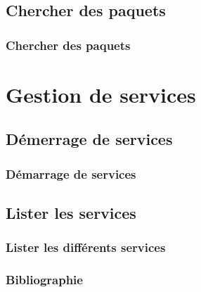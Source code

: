 \documentclass{beamer}
\begin{document}
    \subsection{Chercher des paquets}
    \begin{frame}
        \frametitle{Chercher des paquets}
    \end{frame}
    
    \section{Gestion de services}
    \subsection{Démerrage de services}
    \begin{frame}
        \frametitle{Démarrage de services}
    \end{frame}

    \subsection{Lister les services}
    \begin{frame}
        \frametitle{Lister les différents services}
    \end{frame}

    \begin{frame}[plain]
        \frametitle{Bibliographie}
    \end{frame}
\end{document}
